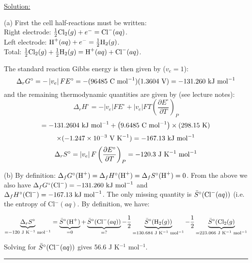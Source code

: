 \noindent
\underline{Solution:}

(a) First the cell half-reactions must be written:\\
Right electrode: $\frac{1}{2}\textnormal{Cl}_2(g) + e^- = \textnormal{Cl}^-(aq)$.\\
Left electrode: $\textnormal{H}^+(aq) + e^- = \frac{1}{2}\textnormal{H}_2(g)$.\\
Total: $\frac{1}{2}\textnormal{Cl}_2(g) + \frac{1}{2}\textnormal{H}_2(g) = \textnormal{H}^+(aq) + \textnormal{Cl}^-(aq)$.

The standard reaction Gibbs energy is then given by ($v_e = 1$):
$$\Delta_r G^\circ = -\left|v_e\right|FE^\circ = -(96485\textnormal{ C mol}^{-1})(1.3604\textnormal{ V}) = -131.260\textnormal{ kJ mol}^{-1}$$
and the remaining thermodynamic quantities are given by (see lecture notes):
$$\Delta_rH^\circ = -\left|v_e\right|FE^\circ + \left|v_e\right|FT\left(\frac{\partial E^\circ}{\partial T}\right)_P$$
$$ = -131.2604\textnormal{ kJ mol}^{-1} + \left(9.6485\textnormal{ C mol}^{-1}\right)\times (298.15\textnormal{ K})$$
$$\times(-1.247\times 10^{-3}\textnormal{ V K}^{-1}) = -167.13\textnormal{ kJ mol}^{-1}$$
$$\Delta_rS^\circ = \left|v_e\right|F\left(\frac{\partial E^\circ}{\partial T}\right)_P = -120.3\textnormal{ J K}^{-1}\textnormal{ mol}^{-1}$$

(b) By definition: $\Delta_fG^\circ(\textnormal{H}^+) = \Delta_fH^\circ(\textnormal{H}^+) = \Delta_fS^\circ(\textnormal{H}^+) = 0$. From the above we also have $\Delta_fG^\circ(\textnormal{Cl}^-) = -131.260\textnormal{ kJ mol}^{-1}$ and $\Delta_fH^\circ(\textnormal{Cl}^-) = -167.13\textnormal{ kJ mol}^{-1}$. The only missing quantity is $\bar{S}^\circ(\textnormal{Cl}^-(aq))$ (i.e. the entropy of Cl$^-(aq)$. By definition, we have:

$$\mathop {\underbrace{\Delta_rS^\circ}}\limits_{=-120\textnormal{ J K}^{-1}\textnormal{ mol}^{-1}} = \mathop {\underbrace{\bar{S}^\circ(\textnormal{H}^+)}}\limits_{=0} + \mathop {\underbrace{\bar{S}^\circ(\textnormal{Cl}^-(aq))}}\limits_{=?} - \frac{1}{2}\mathop {\underbrace{\bar{S}^\circ(\textnormal{H}_2(g))}}\limits_{=130.684\textnormal{ J K}^{-1}\textnormal{ mol}^{-1}} - \frac{1}{2}\mathop {\underbrace{\bar{S}^\circ(\textnormal{Cl}_2(g)}}\limits_{=223.066\textnormal{ J K}^{-1}\textnormal{ mol}^{-1}}$$

Solving for $\bar{S}^\circ(\textnormal{Cl}^-(aq))$ gives 56.6 J K$^{-1}$ mol$^{-1}$.

\hrule\vspace{0.5cm}
